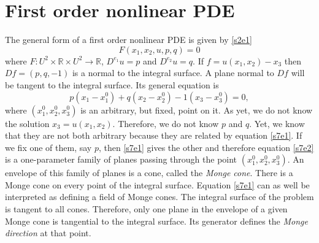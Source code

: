 \documentclass{article}
\theoremstyle{plain}
\numberwithin{thm}{section}
\theoremstyle{plain}
\numberwithin{prop}{section}
\theoremstyle{definition}
\numberwithin{defn}{section}
\theoremstyle{remark}
\numberwithin{equation}{section}
\begin{document}
\section{First order nonlinear PDE}\label{s7}
The general form of a first order nonlinear PDE is given by \eqref{s2e1}
\begin{equation}\label{s7e1}
F(x_1, x_2, u, p, q) = 0
\end{equation}
where $F:U^2 \times \mathbb{R} \times U^2 \rightarrow \mathbb{R}$, $D^{e_1}u = p$ and  
$D^{e_2}u = q$. If $f = u(x_1, x_2) - x_3$ then $Df = (p, q, -1)$ is a normal to the integral surface.
A plane normal to $Df$ will be tangent to the integral surface. Its general equation is
\begin{equation}\label{s7e2}
p(x_1 - x_1^0) + q(x_2 - x_2^0) - 1(x_3 - x_3^0) = 0,
\end{equation}
where $(x_1^0, x_2^0, x_3^0)$ is an arbitrary, but fixed, point on it. As yet, we do not know the 
solution $x_3 = u(x_1, x_2)$. Therefore, we do not know $p$ and $q$. Yet, we know that they are not
both arbitrary because they are related by equation \eqref{s7e1}. If we fix one of them, say $p$,
then \eqref{s7e1} gives the other and therefore equation \eqref{s7e2} is a one-parameter family of
planes passing through the point $(x_1^0, x_2^0, x_3^0)$. An envelope of this family of planes is
a cone, called the \emph{Monge cone}. There is a Monge cone on every point of the integral surface.
Equation \eqref{s7e1} can as well be interpreted as defining a field of Monge cones. The integral 
surface of the problem is tangent to all cones. Therefore, only one plane in the envelope of a given
Monge cone is tangential to the integral surface. Its generator defines the \emph{Monge direction} at 
that point.
\end{document}
